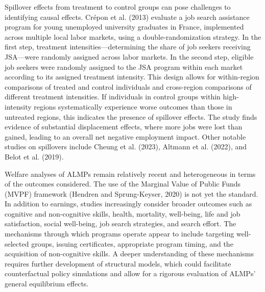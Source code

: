 \documentclass{article}
\begin{document}
Spillover effects from treatment to control groups can pose challenges to identifying causal effects. Crépon et al. (2013) evaluate a job search assistance program for young unemployed university graduates in France, implemented across multiple local labor markets, using a double-randomization strategy. In the first step, treatment intensities—determining the share of job seekers receiving JSA—were randomly assigned across labor markets. In the second step, eligible job seekers were randomly assigned to the JSA program within each market according to its assigned treatment intensity. This design allows for within-region comparisons of treated and control individuals and cross-region comparisons of different treatment intensities. If individuals in control groups within high-intensity regions systematically experience worse outcomes than those in untreated regions, this indicates the presence of spillover effects. The study finds evidence of substantial displacement effects, where more jobs were lost than gained, leading to an overall net negative employment impact. Other notable studies on spillovers include Cheung et al. (2023), Altmann et al. (2022), and Belot et al. (2019).

Welfare analyses of ALMPs remain relatively recent and heterogeneous in terms of the outcomes considered. The use of the Marginal Value of Public Funds (MVPF) framework (Hendren and Sprung-Keyser, 2020) is not yet the standard. In addition to earnings, studies increasingly consider broader outcomes such as cognitive and non-cognitive skills, health, mortality, well-being, life and job satisfaction, social well-being, job search strategies, and search effort. The mechanisms through which programs operate appear to include targeting well-selected groups, issuing certificates, appropriate program timing, and the acquisition of non-cognitive skills. A deeper understanding of these mechanisms requires further development of structural models, which could facilitate counterfactual policy simulations and allow for a rigorous evaluation of ALMPs’ general equilibrium effects.
\end{document}
